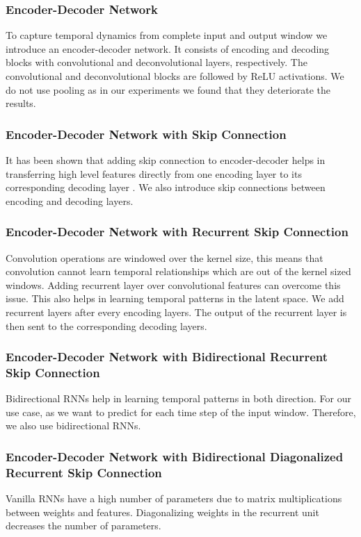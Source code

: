 \documentclass[letterpaper]{article}
\begin{document}
\subsubsection{Encoder-Decoder Network} To capture temporal dynamics from complete input and output window we introduce an encoder-decoder network. It consists of encoding and decoding blocks with convolutional and deconvolutional layers, respectively. The convolutional and deconvolutional blocks are followed by ReLU activations. We do not use pooling as in our experiments we found that they deteriorate the results.

\subsubsection{Encoder-Decoder Network with Skip Connection} It has been shown that adding skip connection to encoder-decoder helps in transferring high level features directly from one encoding layer to its corresponding decoding layer \cite{NIPS2016_6172}. We also introduce skip connections between encoding and decoding layers.

\subsubsection{Encoder-Decoder Network with Recurrent Skip Connection} Convolution operations are windowed over the kernel size, this means that convolution cannot learn temporal relationships which are out of the kernel sized windows. Adding recurrent layer over convolutional features can overcome this issue. This also helps in learning temporal patterns in the latent space. We add recurrent layers after every encoding layers. The output of the recurrent layer is then sent to the corresponding decoding layers.

\subsubsection{Encoder-Decoder Network with Bidirectional Recurrent Skip Connection} Bidirectional RNNs help in learning temporal patterns in both direction. For our use case, as we want to predict for each time step of the input window. Therefore, we also use bidirectional RNNs.

\subsubsection{Encoder-Decoder Network with Bidirectional Diagonalized Recurrent Skip Connection} Vanilla RNNs have a high number of parameters due to matrix multiplications between weights and features. Diagonalizing weights in the recurrent unit decreases the number of parameters.
\end{document}
